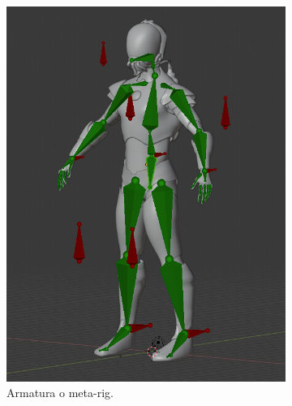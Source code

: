 \begin{figure}
\begin{subfigure}{.33\textwidth}
  \includegraphics[width=\linewidth]{Figures/rig1}
  \caption{Armatura o meta-rig.}
  \bigskip
  \label{fig:rig1}
\end{subfigure}%
\begin{subfigure}{.33\textwidth}
  \centering

\end{subfigure}
\end{figure}
